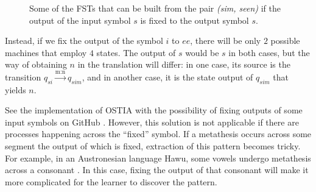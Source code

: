 \begin{figure}[h!] 
\centering
{}
\vspace{0.5em}
\caption{Some of the FSTs that can be built from the pair \emph{(sim, seen)} if the output of the input symbol $s$ is fixed to the output symbol $s$.}
\label{seemsin2}
\end{figure}

Instead, if we fix the output of the symbol $i$ to $ee$, there will be only $2$ possible machines that employ $4$ states.
The output of $s$ would be $s$ in both cases, but the way of obtaining $n$ in the translation will differ: in one case, its source is the transition $q_{si}\xrightarrow{\text{m:n}}q_{sim}$, and in another case, it is the state output of $q_{sim}$ that yields $n$.

See the implementation of OSTIA with the possibility of fixing outputs of some input symbols on GitHub \href{https://github.com/alenaks/OSTIA/blob/master/ostia_biased_outputs.ipynb}{\faGithub} \citep{GHtoktrans}.
However, this solution is not applicable if there are processes happening across the ``fixed'' symbol.
If a metathesis occurs across some segment the output of which is fixed, extraction of this pattern becomes tricky.
For example, in an Austronesian language Hawu, some vowels undergo metathesis across a consonant \citep{Blust2012}.
In this case, fixing the output of that consonant will make it more complicated for the learner to discover the pattern.




